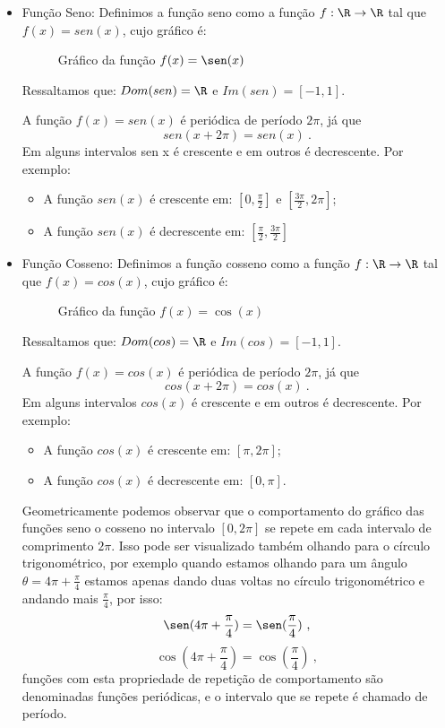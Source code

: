   \begin{itemize}
  \item Função Seno: Definimos a função seno como a função $f: \R \rightarrow \R$ tal que $f(x)= sen(x)$, cujo gráfico é:

  \begin{figure}[H]
  \centering
    \caption{Gráfico da função $f(x)= \sen(x)$}
  \end{figure}
  
Ressaltamos que: $Dom(sen)= \R$ e $Im(sen)= [-1, 1]$.

A função $f(x)= sen(x)$ é periódica de período $2 \pi$, já que 
\[sen(x + 2 \pi)= sen(x) \ .\]
\vskip 0.5cm
Em alguns intervalos sen x é crescente e em outros é decrescente. Por exemplo:
\begin{itemize}
\item A função $sen(x)$ é crescente em: $[0, \frac{\pi}{2}]$ e $[\frac{3\pi}{2}, 2 \pi]$;
\item A função $sen(x)$ é decrescente em: $[\frac{\pi}{2}, \frac{3\pi}{2}]$
\end{itemize}

  \item Função Cosseno: Definimos a função cosseno como a função $f: \R \rightarrow \R$ tal que $f(x)= cos(x)$, cujo gráfico é:

  \begin{figure}[H]
  \centering
    \caption{Gráfico da função $f(x)= \cos(x)$}
  \end{figure}
  
Ressaltamos que: $Dom(cos)= \R$ e $Im(cos)= [-1, 1]$.

A função $f(x)= cos(x)$ é periódica de período $2 \pi$, já que 
\[cos(x + 2 \pi)= cos(x) \ .\]
\vskip 0.5cm
Em alguns intervalos $cos(x)$ é crescente e em outros é decrescente. Por exemplo:
\begin{itemize}
\item A função $cos(x)$ é crescente em: $[\pi, 2\pi]$;
\item A função $cos(x)$ é decrescente em: $[0, \pi]$.
\end{itemize}

  Geometricamente podemos observar que o comportamento do gráfico das funções seno o cosseno no intervalo $[0, 2\pi]$ se repete em cada intervalo de comprimento $2\pi$. Isso pode ser visualizado também olhando para o círculo trigonométrico, por exemplo quando estamos olhando para um ângulo $\theta= 4\pi + \frac{\pi}{4}$ estamos apenas dando duas voltas no círculo trigonométrico e andando mais $\frac{\pi}{4}$, por isso:
\begin{equation}
\sen(4\pi + \frac{\pi}{4})= \sen(\frac{\pi}{4}) \ ,
\end{equation}
\begin{equation}
\cos(4\pi + \frac{\pi}{4})= \cos(\frac{\pi}{4}) \ , 
\end{equation}
  funções com esta propriedade de repetição de comportamento são denominadas funções periódicas, e o intervalo que se repete é chamado de período.


\end{itemize}
